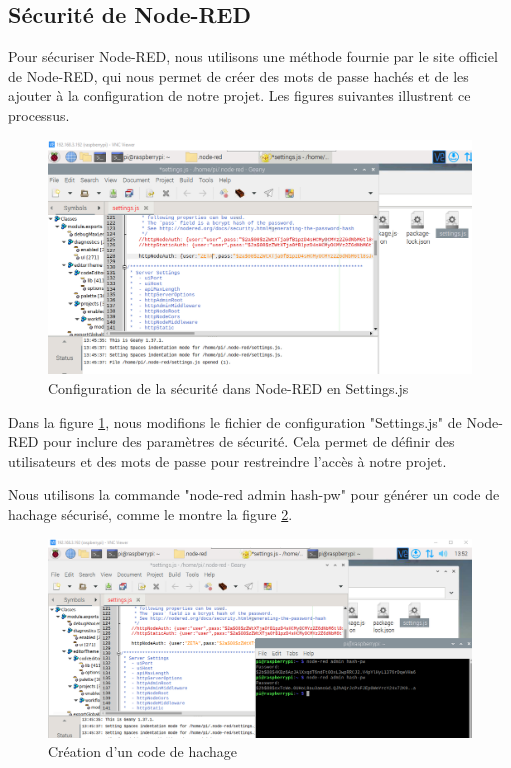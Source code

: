 \subsection{Sécurité de Node-RED}

Pour sécuriser Node-RED, nous utilisons une méthode fournie par le site officiel de Node-RED, qui nous permet de créer des mots de passe hachés et de les ajouter à la configuration de notre projet. Les figures suivantes illustrent ce processus.

\begin{figure}[H]
\centering
\includegraphics[width=14cm]{Images/Node-2.png}
\caption{Configuration de la sécurité dans Node-RED en Settings.js}
\label{Chap4.3.9}
\end{figure}

Dans la figure \ref{Chap4.3.9}, nous modifions le fichier de configuration "Settings.js" de Node-RED pour inclure des paramètres de sécurité. Cela permet de définir des utilisateurs et des mots de passe pour restreindre l'accès à notre projet.

Nous utilisons la commande "node-red admin hash-pw" pour générer un code de hachage sécurisé, comme le montre la figure \ref{Chap4.3.10}.

\begin{figure}[H]
\centering
\includegraphics[width=15cm]{Images/Node-3.png}
\caption{Création d'un code de hachage}
\label{Chap4.3.10}
\end{figure}

